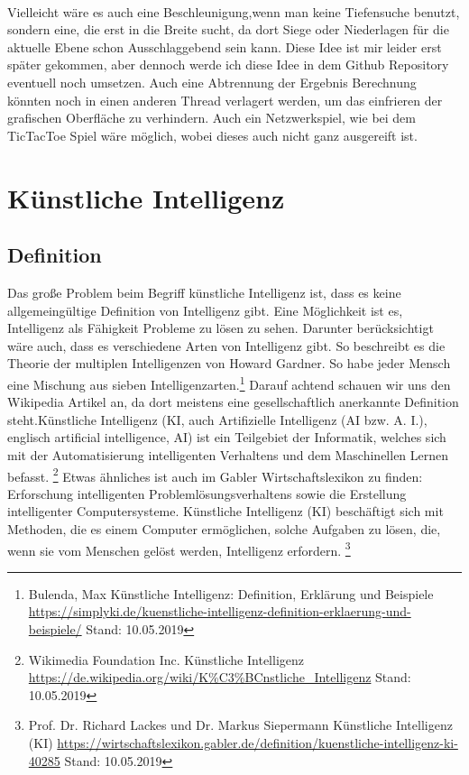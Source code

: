 \documentclass[12pt,a4paper]{article}
\begin{document}
	\\Vielleicht wäre es auch eine Beschleunigung,wenn man keine Tiefensuche benutzt, sondern eine, die erst in die Breite sucht, da dort Siege oder Niederlagen für die aktuelle Ebene schon Ausschlaggebend sein kann. Diese Idee ist mir leider erst später gekommen, aber dennoch werde ich diese Idee in dem Github Repository eventuell noch umsetzen. Auch eine Abtrennung der Ergebnis Berechnung könnten noch in einen anderen Thread verlagert werden, um das einfrieren der grafischen Oberfläche zu verhindern. Auch ein Netzwerkspiel, wie bei dem TicTacToe Spiel wäre möglich, wobei dieses auch nicht ganz ausgereift ist.
	\section{Künstliche Intelligenz}
	\subsection{Definition}
	Das große Problem beim Begriff künstliche Intelligenz ist, dass es keine allgemeingültige Definition von Intelligenz gibt. Eine Möglichkeit ist es, Intelligenz als Fähigkeit Probleme zu lösen zu sehen. Darunter berücksichtigt wäre auch, dass es verschiedene Arten von Intelligenz gibt. So beschreibt es die \glqq Theorie der multiplen Intelligenzen \grqq{} von Howard Gardner. So habe jeder Mensch eine Mischung aus sieben Intelligenzarten.\footnote{Bulenda, Max \glqq Künstliche Intelligenz: Definition, Erklärung und Beispiele \grqq{}\url{https://simplyki.de/kuenstliche-intelligenz-definition-erklaerung-und-beispiele/} Stand: 10.05.2019} 
	Darauf achtend schauen wir uns den Wikipedia Artikel an, da dort meistens eine gesellschaftlich anerkannte Definition steht.\glqq Künstliche Intelligenz (KI, auch Artifizielle Intelligenz (AI bzw. A. I.), englisch artificial intelligence, AI) ist ein Teilgebiet der Informatik, welches sich mit der Automatisierung intelligenten Verhaltens und dem Maschinellen Lernen befasst. \grqq{} \footnote{Wikimedia Foundation Inc. \glqq Künstliche Intelligenz \grqq{} \url{https://de.wikipedia.org/wiki/K\%C3\%BCnstliche_Intelligenz} Stand: 10.05.2019 }
	Etwas ähnliches  ist auch im Gabler Wirtschaftslexikon zu finden: \glqq Erforschung intelligenten Problemlösungsverhaltens sowie die Erstellung intelligenter Computersysteme. Künstliche Intelligenz (KI) beschäftigt sich mit Methoden, die es einem Computer ermöglichen, solche Aufgaben zu lösen, die, wenn sie vom Menschen gelöst werden, Intelligenz erfordern. \grqq{} \footnote{Prof. Dr. Richard Lackes und Dr. Markus Siepermann \glqq Künstliche Intelligenz (KI) \grqq{} \url{https://wirtschaftslexikon.gabler.de/definition/kuenstliche-intelligenz-ki-40285} Stand: 10.05.2019 }
\end{document}

